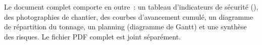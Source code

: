 \begin{appendices}
\vspace{2mm}
Le document complet comporte en outre~: un tableau d'indicateurs de sécurité (), des photographies de chantier, des courbes d'avancement cumulé, un diagramme de répartition du tonnage, un planning (diagramme de Gantt) et une synthèse des risques. Le fichier PDF complet est joint séparément.

\begin{center}
\end{center}

\end{appendices}
